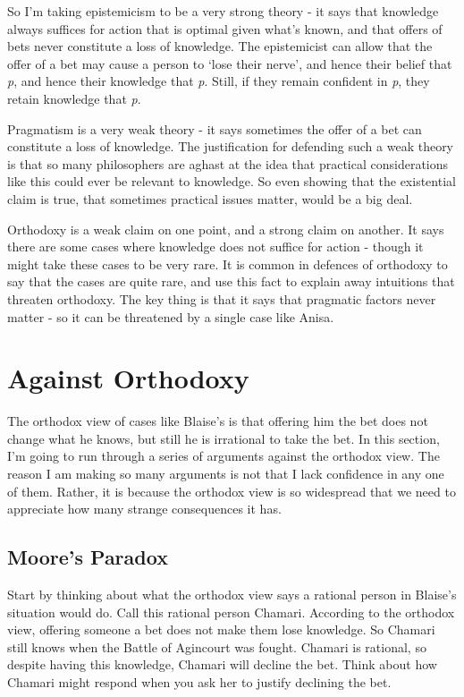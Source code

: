 \documentclass[
  10pt,
  letterpaper,
  twoside]{scrbook}
\begin{document}
So I'm taking epistemicism to be a very strong theory - it says that
knowledge always suffices for action that is optimal given what's known,
and that offers of bets never constitute a loss of knowledge. The
epistemicist can allow that the offer of a bet may cause a person to
`lose their nerve', and hence their belief that \emph{p}, and hence
their knowledge that \emph{p}. Still, if they remain confident in
\emph{p}, they retain knowledge that \emph{p}.

Pragmatism is a very weak theory - it says sometimes the offer of a bet
can constitute a loss of knowledge. The justification for defending such
a weak theory is that so many philosophers are aghast at the idea that
practical considerations like this could ever be relevant to knowledge.
So even showing that the existential claim is true, that sometimes
practical issues matter, would be a big deal.

Orthodoxy is a weak claim on one point, and a strong claim on another.
It says there are some cases where knowledge does not suffice for action
- though it might take these cases to be very rare. It is common in
defences of orthodoxy to say that the cases are quite rare, and use this
fact to explain away intuitions that threaten orthodoxy. The key thing
is that it says that pragmatic factors never matter - so it can be
threatened by a single case like Anisa.

\section{Against Orthodoxy}\label{sec-orthodox}

The orthodox view of cases like Blaise's is that offering him the bet
does not change what he knows, but still he is irrational to take the
bet. In this section, I'm going to run through a series of arguments
against the orthodox view. The reason I am making so many arguments is
not that I lack confidence in any one of them. Rather, it is because the
orthodox view is so widespread that we need to appreciate how many
strange consequences it has.

\subsection{Moore's Paradox}\label{sec-orthodoxmoore}

Start by thinking about what the orthodox view says a rational person in
Blaise's situation would do. Call this rational person Chamari.
According to the orthodox view, offering someone a bet does not make
them lose knowledge. So Chamari still knows when the Battle of Agincourt
was fought. Chamari is rational, so despite having this knowledge,
Chamari will decline the bet. Think about how Chamari might respond when
you ask her to justify declining the bet.
\end{document}

